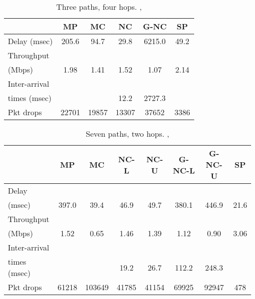 \documentclass[journal, onecolumn, 12pt]{IEEEtran}
\begin{document}
\begin{table}[t]
\begin{center}
\scriptsize
\begin{tabular}{|l|c|c|c|c|c|}
\hline
~                                    & MP & MC & NC & G-NC & SP \\ \hline
Delay (msec)   & 205.6   & 94.7  & 29.8  & 6215.0 & 49.2  \\ \hline
Throughput                   & ~  & ~  & ~  & ~         & ~  \\
(Mbps)                   & 1.98  & 1.41  & 1.52 & 1.07 & 2.14 \\ \hline
Inter-arrival              & ~  & ~  & ~  & ~         & ~  \\
times (msec)   &   &   &  12.2 & 2727.3 & \\ \hline
Pkt drops  & 22701  & 19857  & 13307  & 37652 & 3386 \\ \hline
\end{tabular}
\end{center}
\caption {Three paths, four hops. , }
\label{tab:sim_topol_2}
\end{table}

\begin{table}
\begin{center}
\scriptsize
\begin{tabular}{|l|c|c|c|c|c|c|c|}
\hline
~                                   & MP & MC & NC-L & NC-U & G-NC-L & G-NC-U & SP \\ \hline
Delay           &   &   &  &  & & & \\
(msec)           & 397.0  & 39.4  & 46.9 &  49.7   &  380.1 &  446.9 & 21.6\\ \hline
Throughput             & ~  & ~  & ~    & ~    & ~           & ~           & ~  \\
(Mbps)                 & 1.52  & 0.65  &  1.46   &  1.39  & 1.12  & 0.90 & 3.06  \\ \hline
Inter-arrival             & ~  & ~  & ~    & ~    & ~           & ~           & ~  \\
times (msec)   &   &   &  19.2 & 26.7 &  112.2 &  248.3 &   \\ \hline
Pkt drops          & 61218  & 103649  & 41785 & 41154 & 69925 & 92947 & 478 \\ \hline

\end{tabular}
\end{center}
\caption {Seven paths, two hops. , }
\label{tab:sim_topol_3}
\end{table}
\end{document}
